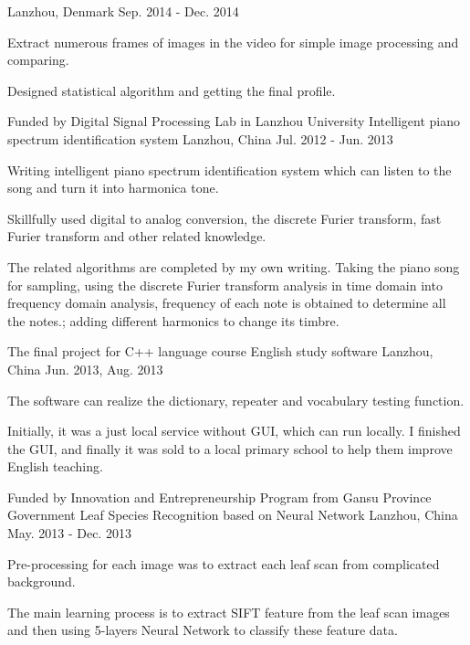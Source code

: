 \begin{cventries}
    {Lanzhou, Denmark}
    {Sep. 2014 - Dec. 2014}
    {
      \begin{cvitems}
        \item {Extract numerous frames of images in the video for simple image processing and comparing.}
        \item {Designed statistical algorithm and getting the final profile.}
      \end{cvitems} 
    }
  \cventry
    {Funded by Digital Signal Processing Lab in Lanzhou University}
    {Intelligent piano spectrum identification system}
    {Lanzhou, China}
    {Jul. 2012 - Jun. 2013}
    {
      \begin{cvitems}
        \item {Writing intelligent piano spectrum identification system which can listen to the song and turn it into harmonica tone.}
        \item {Skillfully used digital to analog conversion, the discrete Furier transform, fast Furier transform and other related knowledge.}
        \item {The related algorithms are completed by my own writing. Taking the piano song for sampling, using the discrete Furier transform analysis in time domain into frequency domain analysis, frequency of each note is obtained to determine all the notes.; adding different harmonics to change its timbre.}
      \end{cvitems}
    }
  \cventry
    {The final project for C++ language course}
    {English study software}
    {Lanzhou, China}
    {Jun. 2013, Aug. 2013}
    {
      \begin{cvitems}
        \item {The software can realize the dictionary, repeater and vocabulary testing function.}
        \item {Initially, it was a just local service without GUI, which can run locally. I finished the GUI, and finally it was sold to a local primary school to help them improve English teaching.}
      \end{cvitems}
    }
  \cventry
    {Funded by Innovation and Entrepreneurship Program from Gansu Province Government}
    {Leaf Species Recognition based on Neural Network}
    {Lanzhou, China}
    {May. 2013 - Dec. 2013}
    {
      \begin{cvitems}
        \item {Pre-processing for each image was to extract each leaf scan from complicated background.}
        \item {The main learning process is to extract SIFT feature from the leaf scan images and then using 5-layers Neural Network to classify these feature data.}
      \end{cvitems}
    }
\end{cventries}
